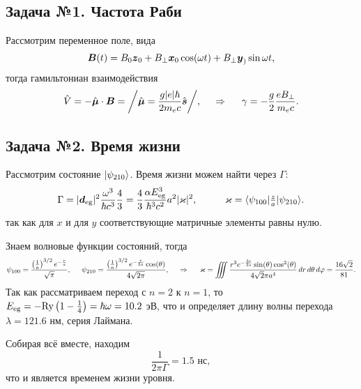 	

\subsection*{Задача №1. Частота Раби} 

Рассмотрим переменное поле, вида
\begin{equation*}
	\mbox{\boldmath $B$}(t) = B_0 \mbox{\boldmath $z$}_0 + B_\bot \mbox{\boldmath $x$}_0 \cos(\omega t) + B_\bot \mbox{\boldmath $y$}_) \sin \omega t,
\end{equation*}
тогда гамильтониан взаимодействия
\begin{equation*}
	\hat{V} = - \hat{\mbox{\boldmath $\mu$}} \cdot \mbox{\boldmath $B$} = \bigg/
		\hat{\mbox{\boldmath $\mu$}} = \frac{g |e| \hbar}{2 m_e c} \hat{\mbox{\boldmath $s$}}
	\bigg/,
	\hspace{0.5cm} \Rightarrow \hspace{0.5cm}
	\gamma = - \frac{g}{2}\frac{e  B_\bot}{m_e c}.
\end{equation*}

\subsection*{Задача №2. Время жизни} 

Рассмотрим состояние $\left| \psi_{210} \right\rangle$. Время жизни можем найти через $\Gamma$:
\begin{equation*}
	\Gamma = |\sub{\vc{d}}{eg}|^2 \frac{\omega^3}{\hbar c^3} \frac{4}{3} =
	\frac{4}{3} \frac{\alpha \sub{E}{eg}^3}{\hbar^3 c^2} a^2 |\varkappa|^2,
	\hspace{10mm}
	\varkappa = \bk{\psi_{100}}[\tfrac{z}{a}]{\psi_{210}}.
\end{equation*}
так как для $x$ и для $y$ соответствующие матричные элементы равны нулю. 

Знаем волновые функции состояний, тогда
\begin{equation*}
	\psi_{100} = \frac{\left(\frac{1}{a}\right)^{3/2} e^{-\frac{r}{a}}}{\sqrt{\pi }},
	\hspace{5mm}
	\psi_{210} = \frac{\left(\frac{1}{a}\right)^{3/2} e^{-\frac{r}{2 a}} \cos (\theta )}{4 \sqrt{2 \pi }},
	\hspace{0.5cm} \Rightarrow \hspace{0.5cm}
	\varkappa = \iiint
	\frac{r^3 e^{-\frac{3 r}{2 a}} \sin (\theta ) \cos ^2(\theta )}{4 \sqrt{2} \pi  a^4}
	\, d r \, d \theta \, d \varphi = 
	\frac{16 \sqrt{2}}{81}.
\end{equation*}
Так как рассматриваем переход с $n=2$ к $n=1$, то $E_{\textnormal{eg}} = -\text{Ry} \left(1 - \frac{1}{4}\right) = \hbar \omega = 10.2$ эВ, что и определяет длину волны перехода $\lambda = 121.6$ нм, серия Лаймана.


Собирая всё вместе, находим
\begin{equation*}
	\frac{1}{2 \pi \Gamma} = 1.5 \text{ нс},
\end{equation*}
что и является временем жизни уровня.
